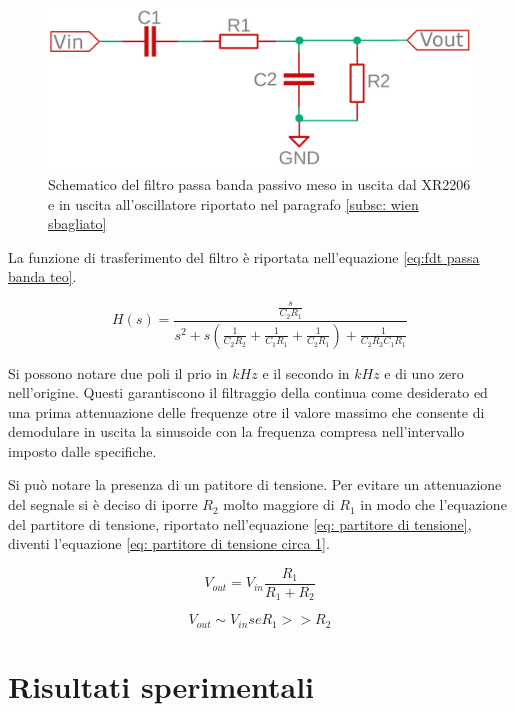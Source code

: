 \documentclass[titlepage]{report}
\begin{document}
\begin{figure}[H]
	\centering
	\includegraphics[scale=0.25]{Immagini/sch_crc_no_valori.png}
	\caption{Schematico del filtro passa banda passivo meso in uscita dal XR2206 e in uscita all'oscillatore riportato nel paragrafo \ref{subsc: wien sbagliato}}
	\label{fig:FiltroBP}
\end{figure}

La funzione di trasferimento del filtro è riportata nell'equazione \ref{eq:fdt passa banda teo}.

\begin{equation}
	\label{eq:fdt passa banda teo}
	H(s) = \frac{\frac{s}{C_2R_1}}{s^2 + s(\frac{1}{C_2R_2} + \frac{1}{C_1R_1} + \frac{1}{C_2R_1}) + \frac{1}{C_2R_2C_1R_1}}
\end{equation}

Si possono notare due poli il prio in \textit{$kHz$} e il secondo in \textit{$kHz$} e di uno zero nell'origine. Questi garantiscono il filtraggio della continua come desiderato ed una prima attenuazione delle frequenze otre il valore massimo che consente di demodulare in uscita la sinusoide con la frequenza compresa nell'intervallo imposto dalle specifiche.

Si può notare la presenza di un patitore di tensione. Per evitare un attenuazione del segnale si è deciso di iporre $R_2$ molto maggiore di $R_1$ in modo che l'equazione del partitore di tensione, riportato nell'equazione \ref{eq: partitore di tensione}, diventi l'equazione \ref{eq: partitore di tensione circa 1}.

\begin{equation}
	V_{out} = V_{in} \frac{R_1}{R_1 + R_2}
	\label{eq: partitore di tensione}
\end{equation}

\begin{equation}
	V_{out} \sim  V_{in}   se   R_1 >> R_2
	\label{eq: partitore di tensione circa 1}
\end{equation}
	
\chapter{Risultati sperimentali}
\label{ch:Risultati_sperimentali}
\end{document}
